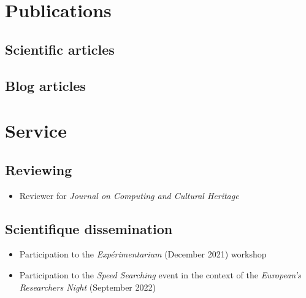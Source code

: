 \documentclass[11pt,a4paper,sans]{moderncv} %
\begin{document}

\section{Publications}
\subsection{Scientific articles}
\begin{refsection}
    \nocite{*}
    \printbibliography[heading=none]
\end{refsection}

\subsection{Blog articles}
\begin{refsection}
    \nocite{*}
    \printbibliography[heading=none]
\end{refsection}

\section{Service}
\subsection{Reviewing}
\begin{itemize}
    \item Reviewer for \textit{Journal on Computing and Cultural Heritage}
\end{itemize}

\subsection{Scientifique dissemination}
\begin{itemize}
    \item Participation to the \textit{Expérimentarium} (December 2021) workshop
    \item Participation to the \textit{Speed Searching} event in the context of the \textit{
    European's Researchers Night} (September 2022)
\end{itemize}

\end{document}
